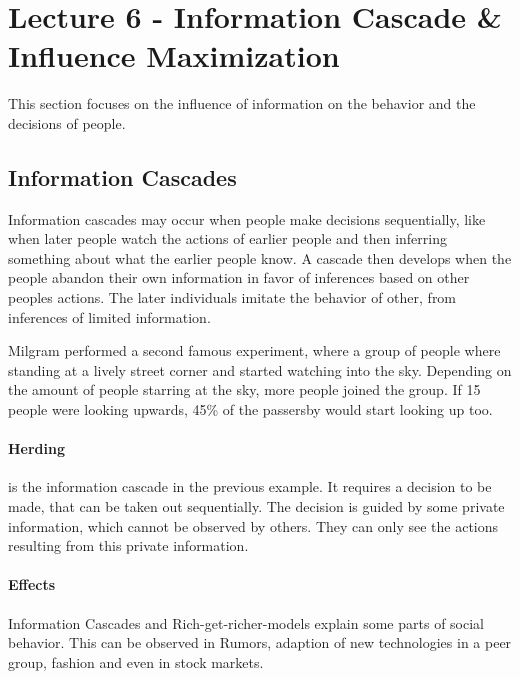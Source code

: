 \section{Lecture 6 - Information Cascade \& Influence Maximization} %
\label{sec:lecture_6_information_cascade_&_influence_maximization}

This section focuses on the influence of information on the behavior
and the decisions of people.

\subsection{Information Cascades} %
\label{sub:information_cascades}
Information cascades may occur when people make decisions sequentially,
like when later people watch the actions of earlier people
and then inferring something about what the earlier people know.
A cascade then develops when the people abandon their own information
in favor of inferences based on other peoples actions.
The later individuals imitate the behavior of other,
from inferences of limited information.

Milgram performed a second famous experiment,
where a group of people where standing at a lively street corner
and started watching into the sky.
Depending on the amount of people starring at the sky,
more people joined the group.
If 15 people were looking upwards,
45\% of the passersby would start looking up too.

\paragraph{Herding} %
\label{par:herding}
is the information cascade in the previous example.
It requires a decision to be made,
that can be taken out sequentially.
The decision is guided by some private information,
which cannot be observed by others.
They can only see the actions resulting from this private information.

\paragraph{Effects} %
\label{par:effects}
Information Cascades and Rich-get-richer-models explain some parts of social behavior.
This can be observed in Rumors,
adaption of new technologies in a peer group,
fashion and even in stock markets.
